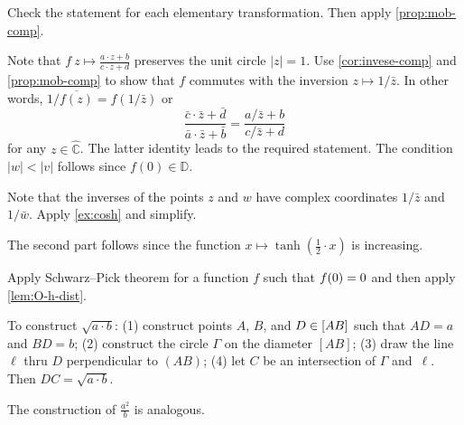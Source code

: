  
Check the statement for each elementary transformation.
Then apply \ref{prop:mob-comp}.

Note that $f\:z\mapsto\tfrac{a\cdot z+b}{c\cdot z+d}$ preserves the unit circle $|z|=1$.
Use \ref{cor:invese-comp} and \ref{prop:mob-comp} to show that $f$ commutes with the inversion $z\mapsto 1/\bar z$.
In other words, $1/\overline{f(z)}=f(1/\bar z)$ or
\[\frac{\bar c\cdot \bar z+\bar d}{\bar a\cdot \bar z+\bar b}
=\frac{a/\bar z+b}{c/\bar z+d}\]
for any $z\in\hat{\mathbb{C}}$.
The latter identity leads to the required statement. 
The condition $|w|<|v|$ follows since $f(0)\in\mathbb{D}$.

Note that the inverses of the points $z$ and $w$ have complex coordinates $1/\bar z$ and $1/\bar w$.
Apply \ref{ex:cosh} and simplify.

The second part follows since the function $x\mapsto \tanh(\tfrac12\cdot x)$ is increasing.

Apply Schwarz--Pick theorem for a function $f$ such that $f(0)=0$ and then apply \ref{lem:O-h-dist}.

\setcounter{eqtn}{0}

%
%
%
%

To construct  $\sqrt{a\cdot b}$:
(1) construct points $A$, $B$, and $D\in [AB]$
such that $AD=a$ and $BD=b$;
(2) construct the circle $\Gamma$ on the diameter $[AB]$;
(3) draw the line $\ell$ thru $D$ perpendicular to $(AB)$; 
(4) let $C$ be an intersection of $\Gamma$ and~$\ell$.
Then $DC= \sqrt{a\cdot b}$.

The construction of $\tfrac{a^2}b$ is analogous.

